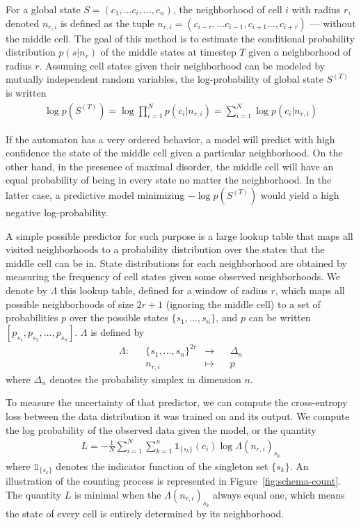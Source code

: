 For a global state $S = (c_{1}, ... c_i, ..., c_{n})$, the neighborhood of cell
$i$ with radius $r$, denoted $n_{r,i}$ is defined as the tuple $n_{r,i} =
(c_{i-r}, ... c_{i-1}, c_{i+1} ..., c_{i+r})$ --- without the middle cell. The
goal of this method is to estimate the conditional probability distribution $p(s
| n_r)$ of the middle states at timestep $T$ given a neighborhood of radius $r$.
Assuming cell states given their neighborhood can be modeled by mutually
independent random variables, the log-probability of global state $S^{(T)}$ is
written
\begin{align}
  \textstyle \log p(S^{(T)}) = \log \prod_{i=1}^N p(c_i | n_{r,i})  =
  \sum_{i=1}^N \log  p(c_i | n_{r,i})
\end{align}

If the automaton has a very ordered behavior, a model will predict with high
confidence the state of the middle cell given a particular neighborhood. On the
other hand, in the presence of maximal disorder, the middle cell will have an
equal probability of being in every state no matter the neighborhood. In the
latter case, a predictive model minimizing $-\log p(S^{(T)})$ would yield a high
negative log-probability.

A simple possible predictor for such purpose is a large lookup table that maps
all visited neighborhoods to a probability distribution over the states that the
middle cell can be in. State distributions for each neighborhood are obtained by
measuring the frequency of cell states given some observed neighborhoods. We
denote by $\Lambda$ this lookup table, defined for a window of radius $r$, which
maps all possible neighborhoods of size $2r + 1$ (ignoring the middle cell) to a
set of probabilities $p$ over the possible states $\{s_1, ..., s_n\}$, and $p$
can be written $[p_{s_1}, p_{s_2}, ... , p_{s_n}]$. $\Lambda$ is defined by
\begin{equation}
  \begin{aligned}
    \textstyle \Lambda :&& \{s_1, ..., s_n\}^{2r} &\to&& \Delta_n\\
    && n_{r,i} &\mapsto&& p
  \end{aligned}
\end{equation}
where $\Delta_n$ denotes the probability simplex in dimension $n$.

To measure the uncertainty of that predictor, we can compute the cross-entropy
loss between the data distribution it was trained on and its output. We compute
the log probability of the observed data given the model, or the quantity
\begin{align}
  \textstyle
  L = - \frac{1}{N}\sum_{i=1}^N \sum_{k=1}^n \mathds{1}_{\{ s_k \}}(c_i)
  \log\Lambda(n_{r,i})_{s_k}
  \label{eq:loss_count}
\end{align}
where $\mathds{1}_{\{s_k\}}$ denotes the indicator function of the singleton set
$\{s_k\}$. An illustration of the counting process is represented in
Figure~\ref{fig:schema-count}. The quantity $L$ is minimal when the
$\Lambda(n_{r,i})_{s_k}$ always equal one, which means the state of every cell
is entirely determined by its neighborhood.

